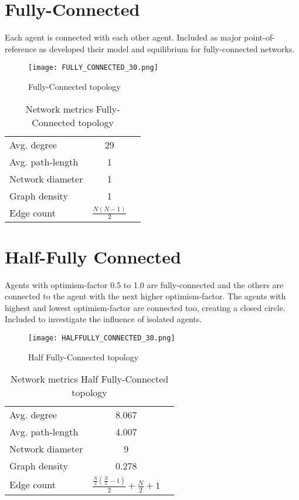 \documentclass[Bachelorarbeit.tex]{subfiles}
\begin{document}
\section{Fully-Connected}

Each agent is connected with each other agent.
\medskip
Included as major point-of-reference as \cite{Breuer2015} developed their model and equilibrium for fully-connected networks.

\begin{figure}[H]
	\centering
  \texttt{[image: FULLY\_CONNECTED\_30.png]}
	\caption{Fully-Connected topology}
	\label{fig:topology_FULLY_CONNECTED_30}
\end{figure}

\begin{table}[H]
	\centering
	\caption{Network metrics Fully-Connected topology}
	\begin{tabular} { l c r }
		\hline
		Avg. degree & 29 \\
		Avg. path-length & 1 \\
		Network diameter & 1 \\
		Graph density & 1 \\
		Edge count & $\frac{N(N - 1)}{2}$ \\
		\hline
	\end{tabular}
\end{table}

\section{Half-Fully Connected}
Agents with optimism-factor 0.5 to 1.0 are fully-connected and the others are connected to the agent with the next higher optimism-factor. The agents with highest and lowest optimism-factor are connected too, creating a closed circle.
\medskip
Included to investigate the influence of isolated agents.

\begin{figure}[H]
	\centering
  \texttt{[image: HALFFULLY\_CONNECTED\_30.png]}
	\caption{Half Fully-Connected topology}
	\label{fig:topology_HALFFULLY_CONNECTED_30}
\end{figure}

\begin{table}[H]
	\centering
	\caption{Network metrics Half Fully-Connected topology}
	\begin{tabular} { l c r }
		\hline
		Avg. degree & 8.067 \\
		Avg. path-length & 4.007 \\
		Network diameter & 9 \\
		Graph density & 0.278 \\
		Edge count & $\frac{\frac{N}{2}(\frac{N}{2} - 1)}{2} + \frac{N}{2} + 1$ \\
		\hline
	\end{tabular}
\end{table}
\end{document}
